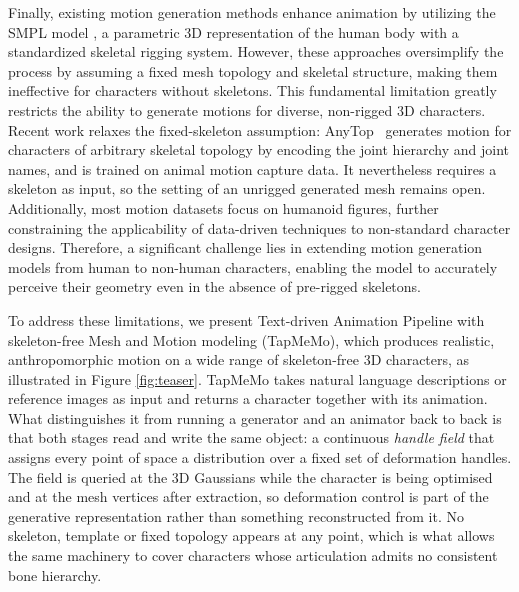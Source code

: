\documentclass[lettersize,journal]{IEEEtran}
\newcommand{\blu}[1]{\texorpdfstring{{\leavevmode\color{blue}#1}}{#1}}
\begin{document}
Finally, existing motion generation methods \cite{zhang2024motiondiffuse,tevet2022human,chen2022executing,zhang2024modular} enhance animation by utilizing the SMPL model \cite{loper2015smpl}, a parametric 3D representation of the human body with a standardized skeletal rigging system. However, these approaches oversimplify the process by assuming a fixed mesh topology and skeletal structure, making them ineffective for characters without skeletons. This fundamental limitation greatly restricts the ability to generate motions for diverse, non-rigged 3D characters. \blu{Recent work relaxes the fixed-skeleton assumption: AnyTop~\cite{gat2025anytop}
generates motion for characters of arbitrary skeletal topology by encoding the joint
hierarchy and joint names, and is trained on animal motion capture data. It nevertheless
requires a skeleton as input, so the setting of an unrigged generated mesh remains open.} Additionally, most motion datasets focus on humanoid figures, further constraining the applicability of data-driven techniques to non-standard character designs. Therefore, a significant challenge lies in extending motion generation models from human to non-human characters, enabling the model to accurately perceive their geometry even in the absence of pre-rigged skeletons.

To address these limitations, we present Text-driven Animation Pipeline with skeleton-free Mesh and Motion modeling (TapMeMo), which produces realistic, anthropomorphic motion on a wide range of skeleton-free 3D characters, as illustrated in Figure \ref{fig:teaser}. TapMeMo takes natural language descriptions or reference images as input and returns a character together with its animation. What distinguishes it from running a generator and an animator back to back is that both stages read and write the same object: a continuous \textit{handle field} that assigns every point of space a distribution over a fixed set of deformation handles. The field is queried at the 3D Gaussians while the character is being optimised and at the mesh vertices after extraction, so deformation control is part of the generative representation rather than something reconstructed from it. No skeleton, template or fixed topology appears at any point, which is what allows the same machinery to cover characters whose articulation admits no consistent bone hierarchy.
\end{document}
